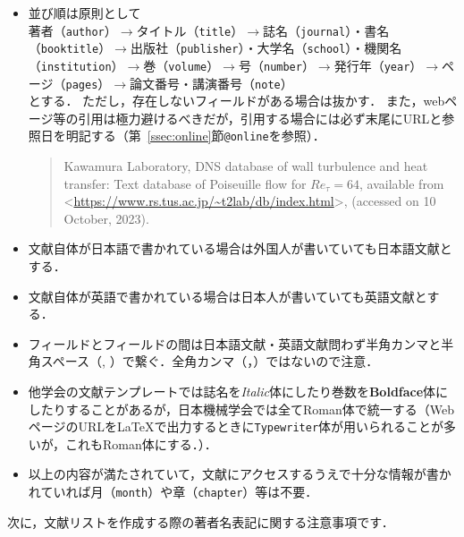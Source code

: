 \documentclass[a4paper,fleqn,uplatex,dvipdfmx]{jsarticle}
\makeatletter
\newcommand{\ttonline}{\texttt{@online}}
\makeatother
\begin{document}
\begin{itembox}[l]{}
    \begin{itemize}
        \item 並び順は原則として \\
            著者（\verb|author|）$\to$タイトル（\verb|title|）$\to$誌名（\verb|journal|）・書名（\verb|booktitle|）$\to$出版社（\verb|publisher|）・大学名（\verb|school|）・機関名（\verb|institution|）$\to$巻（\verb|volume|）$\to$号（\verb|number|）$\to$発行年（\verb|year|）$\to$ページ（\verb|pages|）$\to$論文番号・講演番号（\verb|note|） \\
            とする．
            ただし，存在しないフィールドがある場合は抜かす．
            また，webページ等の引用は極力避けるべきだが，引用する場合には必ず末尾にURLと参照日を明記する（第~\ref{ssec:online}節\ttonline を参照）．
            \begin{quote}
                Kawamura Laboratory, DNS database of wall turbulence and heat transfer: Text database of Poiseuille flow for $\mathit{Re}_\tau = 64$, available from \textless\url{https://www.rs.tus.ac.jp/~t2lab/db/index.html}\textgreater, (accessed on 10 October, 2023).
            \end{quote}
        \item 文献自体が日本語で書かれている場合は外国人が書いていても日本語文献とする．
        \item 文献自体が英語で書かれている場合は日本人が書いていても英語文献とする．
        \item フィールドとフィールドの間は日本語文献・英語文献問わず半角カンマと半角スペース（, ）で繋ぐ．全角カンマ（，）ではないので注意．
        \item 他学会の文献テンプレートでは誌名を\textit{Italic}体にしたり巻数を\textbf{Boldface}体にしたりすることがあるが，日本機械学会では全て\textrm{Roman}体で統一する（WebページのURLを\LaTeX{}で出力するときに\texttt{Typewriter}体が用いられることが多いが，これも\textrm{Roman}体にする．）．
        \item 以上の内容が満たされていて，文献にアクセスするうえで十分な情報が書かれていれば月（\verb|month|）や章（\verb|chapter|）等は不要．
    \end{itemize}
\end{itembox}
次に，文献リストを作成する際の著者名表記に関する注意事項です．
\renewcommand\UrlFont{\ttfamily}
\end{document}
